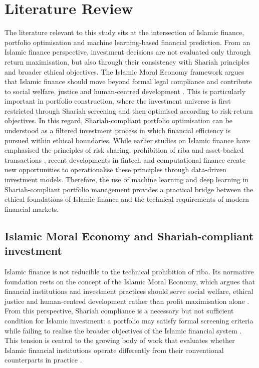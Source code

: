 \section{Literature Review}

The literature relevant to this study sits at the intersection of Islamic finance, portfolio optimisation and machine learning-based financial prediction. 
From an Islamic finance perspective, investment decisions are not evaluated only through return maximisation, but also through their consistency with Shariah principles and broader ethical objectives. 
The Islamic Moral Economy framework argues that Islamic finance should move beyond formal legal compliance and contribute to social welfare, justice and human-centred development \citep{asutay2007conceptualisation, asutay2012conceptualising}. 
This is particularly important in portfolio construction, where the investment universe is first restricted through Shariah screening and then optimised according to risk-return objectives. 
In this regard, Shariah-compliant portfolio optimisation can be understood as a filtered investment process in which financial efficiency is pursued within ethical boundaries. 
While earlier studies on Islamic finance have emphasised the principles of risk sharing, prohibition of riba and asset-backed transactions \citep{elgamal2006islamic, ayub2009understanding, chong2009islamic}, 
recent developments in fintech and computational finance create new opportunities to operationalise these principles through data-driven investment models. 
Therefore, the use of machine learning and deep learning in Shariah-compliant portfolio management provides a practical bridge between the ethical foundations of Islamic finance and the technical requirements of modern financial markets.


\subsection{Islamic Moral Economy and Shariah-compliant investment}

Islamic finance is not reducible to the technical prohibition of riba. Its normative
foundation rests on the concept of the Islamic Moral Economy, which argues that
financial institutions and investment practices should serve social welfare, ethical
justice and human-centred development rather than profit maximisation alone
\citep{asutay2007conceptualisation, asutay2012conceptualising}. From this
perspective, Shariah compliance is a necessary but not sufficient condition for
Islamic investment: a portfolio may satisfy formal screening criteria while failing
to realise the broader objectives of the Islamic financial system
\citep{asutay2012conceptualising}. This tension is central to the growing body of
work that evaluates whether Islamic financial institutions operate differently from
their conventional counterparts in practice \citep{chong2009islamic,
gheeraert2014islamic}.

